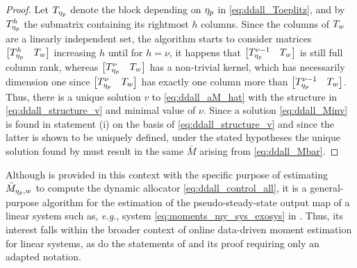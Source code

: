 \begin{proof}
  Let  $T_{\eta_p}$ denote the block depending on $\eta_p$ in \eqref{eq:ddall_Toeplitz}, and by $T_{\eta_p}^h$ the submatrix containing its rightmost $h$ columns. Since the columns of $T_w$ are a linearly independent set, the algorithm starts to consider matrices $\begin{bmatrix}T_{\eta_p}^h & T_w\end{bmatrix}$ increasing $h$ until for $h=\nu$, it happens that $\begin{bmatrix}T_{\eta_p}^{\nu-1} & T_w\end{bmatrix}$ is still full column rank, whereas $\begin{bmatrix}T_{\eta_p}^{\nu} & T_w\end{bmatrix}$ has a non-trivial kernel, which has necessarily dimension one since $\begin{bmatrix}T_{\eta_p}^{\nu} & T_w\end{bmatrix}$ has exactly one column more than $\begin{bmatrix}T_{\eta_p}^{\nu-1} & T_w\end{bmatrix}$. Thus, there is a unique solution $v$ to \eqref{eq:ddall_aM_hat} with the structure in \eqref{eq:ddall_structure_v} and minimal value of $\nu$. Since a solution \eqref{eq:ddall_Minv} is found in statement (i) on the basis of \eqref{eq:ddall_structure_v} and since the latter is shown to be uniquely defined, under the stated hypotheses the unique solution found by  must result in the same $\bar{M}$ arising from \eqref{eq:ddall_Mbar}.
\end{proof}

\begin{remark}
  Although  is provided in this context with the specific purpose of estimating $\bar{M}_{\eta_p,w}$ to compute the dynamic allocator \eqref{eq:ddall_control_all}, it is a general-purpose algorithm for the estimation of the pseudo-steady-state output map of a linear system such as, \emph{e.g.}, system \eqref{eq:moments_my_sys_exosys} in . Thus, its interest falls within the broader context of online data-driven moment estimation for linear systems, as do the statements of  and its proof requiring only an adapted notation.\closeremark
\end{remark}

